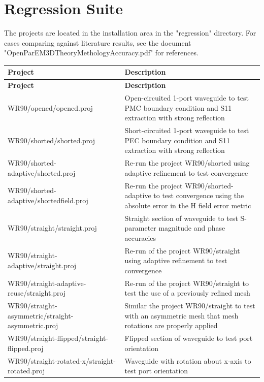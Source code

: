 \documentclass[titlepage]{article}
\renewcommand\_{\textunderscore\linebreak[1]}
\begin{document}
\newpage
\section{Regression Suite}
\label{sec:regression_suite}

The projects are located in the installation area in the "regression" directory.  For cases comparing against literature results, see the document "OpenParEM3D\_Theory\_Methology\_Accuracy.pdf" for references.

\tabcolsep=0.1cm
\small
\begin{longtable}[c]{|p{7cm}p{9cm}|}
    \hline
    \textbf{Project} & \textbf{Description} \\
    \hline
    \endfirsthead
    \hline
    \textbf{Project} & \textbf{Description} \\
    \hline
    \endhead
   WR90/opened/opened.proj                  & Open-circuited 1-port waveguide to test PMC boundary condition and S11 extraction with strong reflection \\
   WR90/shorted/shorted.proj                  & Short-circuited 1-port waveguide to test PEC boundary condition and S11 extraction with strong reflection \\
   WR90/shorted-adaptive/shorted.proj         & Re-run the project WR90/shorted using adaptive refinement to test convergence \\
   WR90/shorted-adaptive/shorted\_field.proj       & Re-run the project WR90/shorted-adaptive to test convergence using the absolute error in the H field error metric \\
   WR90/straight/straight.proj                 & Straight section of waveguide to test S-parameter magnitude and phase accuracies \\
   WR90/straight-adaptive/straight.proj       & Re-run of the project WR90/straight using adaptive refinement to test convergence \\
   WR90/straight-adaptive-reuse/straight.proj  & Re-run of the project WR90/straight to test the use of a previously refined mesh \\
   WR90/straight-asymmetric/straight-asymmetric.proj      & Similar the project WR90/straight to test with an asymmetric mesh that mesh rotations are properly applied \\
   WR90/straight-flipped/straight-flipped.proj         & Flipped section of waveguide to test port orientation \\
   WR90/straight-rotated-x/straight-rotated.proj      & Waveguide with rotation about x-axis to test port orientation \\

\end{longtable}
\end{document}
